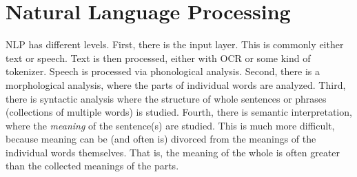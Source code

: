 \section{Natural Language Processing}\label{sec:nlp}

NLP has different levels.
First, there is the input layer. This is commonly either text or speech. Text
is then processed, either with OCR or some kind of tokenizer. Speech is
processed via phonological analysis. Second, there is a
morphological analysis, where the parts of individual words are
analyzed. Third, there is syntactic analysis where the structure of
whole sentences or phrases (collections of multiple words) is studied. Fourth,
there is semantic interpretation, where the \textit{meaning} of the
sentence(s) are studied. This is much more difficult, because meaning can be
(and often is) divorced from the meanings of the individual words themselves.
That is, the meaning of the whole is often greater than the collected meanings
of the parts.

